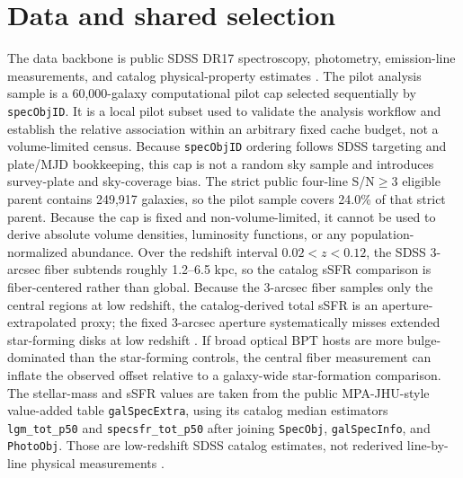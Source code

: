 \documentclass[twocolumn]{aastex631}
\begin{document}
\section{Data and shared selection}
The data backbone is public SDSS DR17 spectroscopy, photometry, emission-line measurements, and catalog physical-property estimates \citep{york2000,sdssdr17,brinchmann2004}. The pilot analysis sample is a 60,000-galaxy computational pilot cap selected sequentially by \texttt{specObjID}. It is a local pilot subset used to validate the analysis workflow and establish the relative association within an arbitrary fixed cache budget, not a volume-limited census. Because \texttt{specObjID} ordering follows SDSS targeting and plate/MJD bookkeeping, this cap is not a random sky sample and introduces survey-plate and sky-coverage bias. The strict public four-line S/N$\geq3$ eligible parent contains 249,917 galaxies, so the pilot sample covers 24.0\% of that strict parent. Because the cap is fixed and non-volume-limited, it cannot be used to derive absolute volume densities, luminosity functions, or any population-normalized abundance.
Over the redshift interval $0.02<z<0.12$, the SDSS 3-arcsec fiber subtends roughly 1.2--6.5 kpc, so the catalog sSFR comparison is fiber-centered rather than global.
Because the 3-arcsec fiber samples only the central regions at low redshift, the catalog-derived total sSFR is an aperture-extrapolated proxy; the fixed 3-arcsec aperture systematically misses extended star-forming disks at low redshift \citep{kewley2005}. If broad optical BPT hosts are more bulge-dominated than the star-forming controls, the central fiber measurement can inflate the observed offset relative to a galaxy-wide star-formation comparison.
The stellar-mass and sSFR values are taken from the public MPA-JHU-style value-added table \texttt{galSpecExtra}, using its catalog median estimators \texttt{lgm\_tot\_p50} and \texttt{specsfr\_tot\_p50} after joining \texttt{SpecObj}, \texttt{galSpecInfo}, and \texttt{PhotoObj}. Those are low-redshift SDSS catalog estimates, not rederived line-by-line physical measurements \citep{brinchmann2004,sdssdr17,york2000}.
\end{document}
